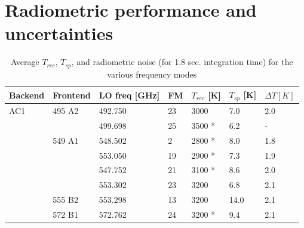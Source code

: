 \section{Radiometric performance and uncertainties}
\label{sec:radper}


\begin{table}
\caption{ Average \(T_{rec}\), \(T_{sp}\), and radiometric noise (for 1.8 sec. integration time) for the various frequency modes }
\label{table:config5}
\begin{tabular}{|l|l|l|l|l|l|l|}
  \hline
  \textbf{Backend} & \textbf{Frontend} & \textbf{LO freq {[}GHz{]}} & \textbf{FM} & \textbf{\(T_{rec}\) {[}K{]}} & \textbf{\(T_{sp}\) {[}K{]}} & \textbf{\(\Delta T [K]\)} \\
  \hline
  AC1              & 495 A2            & 492.750                    & 23          & 3000                  & 7.0  & 2.0\\
  \cline{3-3}
  \cline{4-4}
  \cline{5-5}
  \cline{6-6}
  \cline{7-7}
                   &                    & 499.698                   & 25          & 3500 *                & 6.2  & -\\
  \cline{2-2}
  \cline{3-3}
  \cline{4-4}
  \cline{5-5}
  \cline{6-6}
  \cline{7-7}
                   & 549 A1             & 548.502                  & 2            & 2800 *                & 8.0 & 1.8 \\
  \cline{3-3}
  \cline{4-4}
  \cline{5-5}
  \cline{6-6}
  \cline{7-7}
                  &                     & 553.050                  & 19           & 2900 *                & 7.3 & 1.9 \\
  \cline{3-3}
  \cline{4-4}
  \cline{5-5}
  \cline{6-6}
  \cline{7-7}
                  &                     & 547.752                  & 21           & 3100 *                & 8.6 & 2.0 \\
  \cline{3-3}
  \cline{4-4}
  \cline{5-5}
  \cline{6-6}
  \cline{7-7}
                  &                     & 553.302                  & 23           & 3200                  & 6.8 & 2.1 \\
  \cline{2-2}
  \cline{3-3}
  \cline{4-4}
  \cline{5-5}
  \cline{6-6}
  \cline{7-7}
                 & 555 B2              & 553.298                   & 13           & 3200                  & 14.0 & 2.1 \\
  \cline{2-2}
  \cline{3-3}
  \cline{4-4}
  \cline{5-5}
  \cline{6-6}
  \cline{7-7}
                & 572 B1               & 572.762                   & 24           & 3200 *                & 9.4 & 2.1 \\

\end{tabular}
\end{table}
